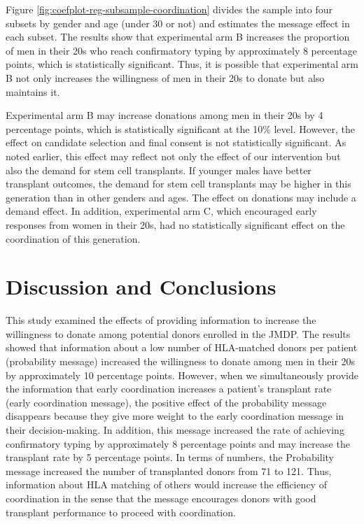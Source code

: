 \documentclass[
  11pt,
  a4paper
]{article}
\begin{document}
Figure \ref{fig:coefplot-reg-subsample-coordination} divides the sample into four subsets by gender and age (under 30 or not) and estimates the message effect in each subset. The results show that experimental arm B increases the proportion of men in their 20s who reach confirmatory typing by approximately 8 percentage points, which is statistically significant. Thus, it is possible that experimental arm B not only increases the willingness of men in their 20s to donate but also maintains it.

Experimental arm B may increase donations among men in their 20s by 4 percentage points, which is statistically significant at the 10\% level. However, the effect on candidate selection and final consent is not statistically significant. As noted earlier, this effect may reflect not only the effect of our intervention but also the demand for stem cell transplants. If younger males have better transplant outcomes, the demand for stem cell transplants may be higher in this generation than in other genders and ages. The effect on donations may include a demand effect. In addition, experimental arm C, which encouraged early responses from women in their 20s, had no statistically significant effect on the coordination of this generation.

\hypertarget{conclusion}{%
\section{Discussion and Conclusions}\label{conclusion}}

This study examined the effects of providing information to increase the willingness to donate among potential donors enrolled in the JMDP. The results showed that information about a low number of HLA-matched donors per patient (probability message) increased the willingness to donate among men in their 20s by approximately 10 percentage points. However, when we simultaneously provide the information that early coordination increases a patient's transplant rate (early coordination message), the positive effect of the probability message disappears because they give more weight to the early coordination message in their decision-making. In addition, this message increased the rate of achieving confirmatory typing by approximately 8 percentage points and may increase the transplant rate by 5 percentage points. In terms of numbers, the Probability message increased the number of transplanted donors from 71 to 121. Thus, information about HLA matching of others would increase the efficiency of coordination in the sense that the message encourages donors with good transplant performance to proceed with coordination.
\end{document}
